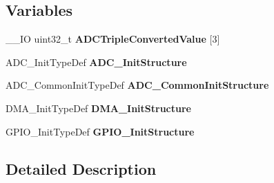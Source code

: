 \subsection*{Variables}
\begin{DoxyCompactItemize}
\item 
\hypertarget{group___a_d_c___interleaved___d_m_amode2_ga7a6054ee8912c965f4b9118912cb3d16}{\-\_\-\-\_\-\-I\-O uint32\-\_\-t {\bfseries A\-D\-C\-Triple\-Converted\-Value} \mbox{[}3\mbox{]}}\label{group___a_d_c___interleaved___d_m_amode2_ga7a6054ee8912c965f4b9118912cb3d16}

\item 
\hypertarget{group___a_d_c___interleaved___d_m_amode2_ga1bc817390b4299e36ea60fff85e6df6b}{A\-D\-C\-\_\-\-Init\-Type\-Def {\bfseries A\-D\-C\-\_\-\-Init\-Structure}}\label{group___a_d_c___interleaved___d_m_amode2_ga1bc817390b4299e36ea60fff85e6df6b}

\item 
\hypertarget{group___a_d_c___interleaved___d_m_amode2_ga8f0279239726b2c7efa0447cf025d772}{A\-D\-C\-\_\-\-Common\-Init\-Type\-Def {\bfseries A\-D\-C\-\_\-\-Common\-Init\-Structure}}\label{group___a_d_c___interleaved___d_m_amode2_ga8f0279239726b2c7efa0447cf025d772}

\item 
\hypertarget{group___a_d_c___interleaved___d_m_amode2_gae0d08750e73250f6a9953cd0724658a3}{D\-M\-A\-\_\-\-Init\-Type\-Def {\bfseries D\-M\-A\-\_\-\-Init\-Structure}}\label{group___a_d_c___interleaved___d_m_amode2_gae0d08750e73250f6a9953cd0724658a3}

\item 
\hypertarget{group___a_d_c___interleaved___d_m_amode2_ga58d8a7f3700f34e7226b33e61f5ed960}{G\-P\-I\-O\-\_\-\-Init\-Type\-Def {\bfseries G\-P\-I\-O\-\_\-\-Init\-Structure}}\label{group___a_d_c___interleaved___d_m_amode2_ga58d8a7f3700f34e7226b33e61f5ed960}

\end{DoxyCompactItemize}


\subsection{Detailed Description}


